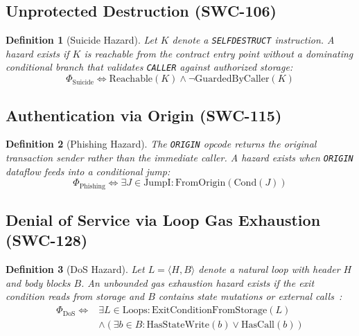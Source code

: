 \documentclass[conference]{IEEEtran}
\newtheorem{defn}{Definition}
\newenvironment{definition}[1][]{\begin{defn}[#1]\upshape}{\end{defn}}
\begin{document}
\subsection{Unprotected Destruction (SWC-106)}
\begin{definition}[Suicide Hazard]
Let $K$ denote a \texttt{SELFDESTRUCT} instruction. A hazard exists if $K$ is reachable from the contract entry point without a dominating conditional branch that validates \texttt{CALLER} against authorized storage:
\begin{equation}
\Phi_{\mathrm{Suicide}} \iff \mathrm{Reachable}(K) \land \neg \mathrm{GuardedByCaller}(K)
\end{equation}
\end{definition}

\subsection{Authentication via Origin (SWC-115)}
\begin{definition}[Phishing Hazard]
The \texttt{ORIGIN} opcode returns the original transaction sender rather than the immediate caller. A hazard exists when \texttt{ORIGIN} dataflow feeds into a conditional jump:
\begin{equation}
\Phi_{\mathrm{Phishing}} \iff \exists J \in \mathrm{JumpI} : \mathrm{FromOrigin}(\mathrm{Cond}(J))
\end{equation}
\end{definition}

\subsection{Denial of Service via Loop Gas Exhaustion (SWC-128)}
\begin{definition}[DoS Hazard]
Let $L = \langle H, B \rangle$ denote a natural loop with header $H$ and body blocks $B$. An unbounded gas exhaustion hazard exists if the exit condition reads from storage and $B$ contains state mutations or external calls~\cite{grech2018madmax, albert2020gasol}:
\begin{align}
\Phi_{\mathrm{DoS}} \iff &\exists L \in \mathrm{Loops} : \mathrm{ExitConditionFromStorage}(L) \nonumber \\
&\land (\exists b \in B : \mathrm{HasStateWrite}(b) \lor \mathrm{HasCall}(b))
\end{align}
\end{definition}

\end{document}
